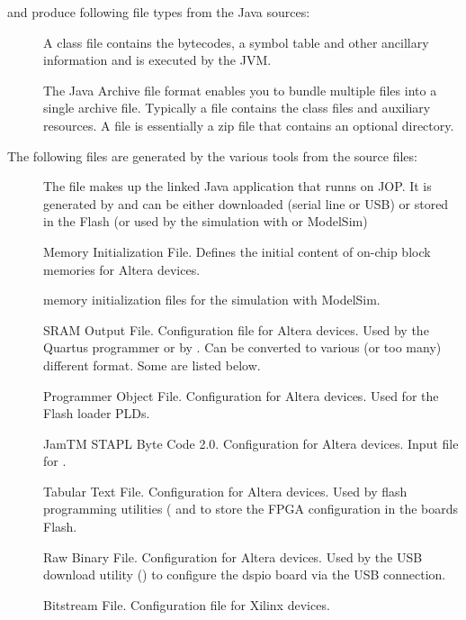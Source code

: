  and  produce following file types from the Java
sources:

\begin{description}

\item[] A class file contains the bytecodes, a symbol table and other
ancillary information and is executed by the JVM.

\item[] The Java Archive file format enables you to bundle multiple files
into a single archive file. Typically a  file contains
the class files and auxiliary resources. A  file is
essentially a zip file that contains an optional 
directory.

\end{description}

The following files are generated by the various tools from the
source files:

\begin{description}

\item[] The file makes up the linked Java application that
runns on JOP. It is generated by  and can be either
downloaded (serial line or USB) or stored in the Flash (or used by
the simulation with  or ModelSim)

\item[] Memory Initialization File. Defines the initial
content of on-chip block memories for Altera devices.

\item[] memory initialization files for the simulation
with ModelSim.

\item[] SRAM Output File. Configuration file for Altera
devices. Used by the Quartus programmer or by .
Can be converted to various (or too many) different format. Some are
listed below.

\item[] Programmer Object File. Configuration for Altera
devices. Used for the Flash loader PLDs.

\item[] JamTM STAPL Byte Code 2.0. Configuration for Altera
devices. Input file for .

\item[] Tabular Text File. Configuration for Altera
devices. Used by flash programming utilities ( and
 to store the FPGA configuration in the boards Flash.

\item[] Raw Binary File. Configuration for Altera
devices. Used by the USB download utility () to
configure the dspio board via the USB connection.

\item[] Bitstream File. Configuration file for Xilinx
devices.

\end{description}

